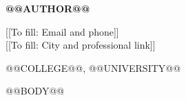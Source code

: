 \documentclass[11pt]{article}
\renewcommand{\missingfield}[1]{\textcolor{red!70!black}{[[To fill: #1]]}}
\begin{document}
{\LARGE\bfseries @@AUTHOR@@}\hfill
\begin{minipage}[t]{0.44\textwidth}
\raggedleft
\missingfield{Email and phone}\\
\missingfield{City and professional link}
\end{minipage}

@@COLLEGE@@, @@UNIVERSITY@@

@@BODY@@
\end{document}
